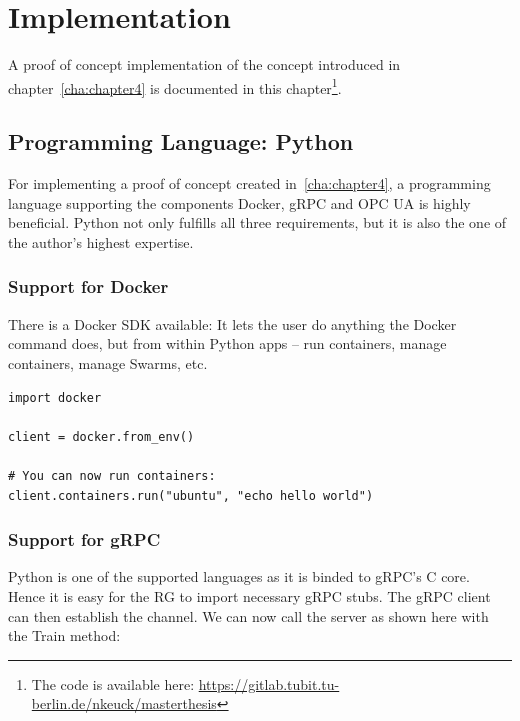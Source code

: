\chapter{Implementation\label{cha:chapter5}}
A proof of concept implementation of the concept introduced in chapter~\ref{cha:chapter4} is documented in this chapter\footnote{The code is available here: \url{https://gitlab.tubit.tu-berlin.de/nkeuck/masterthesis}}.

\section{Programming Language: Python}
For implementing a proof of concept created in~\ref{cha:chapter4}, a programming language supporting the components Docker, gRPC and OPC UA is highly beneficial. Python not only fulfills all three requirements, but it is also the one of the author's highest expertise.

\subsection{Support for Docker}
There is a Docker SDK available: It lets the user do anything the Docker command does, but from within Python apps – run containers, manage containers, manage Swarms, etc.~\cite{Docker-Py-Documentation2019Docker2019}
\begin{verbatim}
import docker

client = docker.from_env()

# You can now run containers:
client.containers.run("ubuntu", "echo hello world")
\end{verbatim}

\subsection{Support for gRPC}
\label{sec:grpcpython}
Python is one of the supported languages as it is binded to gRPC's C core.~\cite{gRPC-Documentation2019Last2019} Hence it is easy for the RG to import necessary gRPC stubs. The gRPC client can then establish the channel. We can now call the server as shown here with the Train method:

